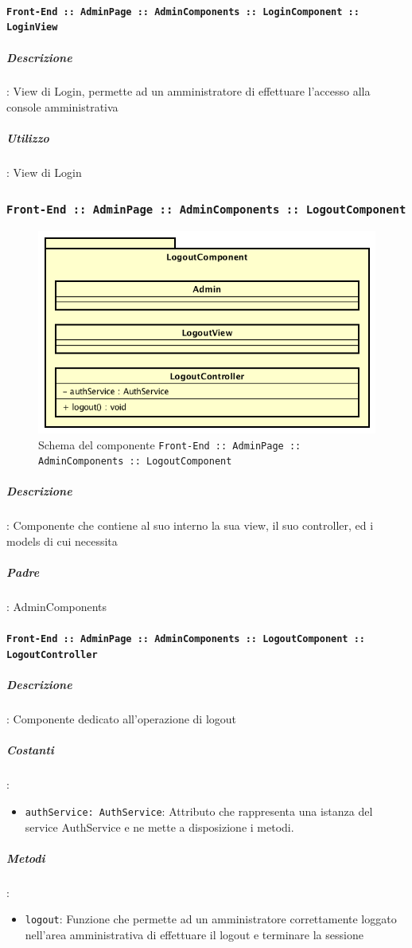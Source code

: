 \documentclass[../DefinizioneDiProdotto_v2.0.0.tex]{subfiles}
\begin{document}
	  		\paragraph{\texttt{Front-End :: AdminPage :: AdminComponents :: LoginComponent :: LoginView}}
				\subparagraph{Descrizione}: View di Login, permette ad un amministratore di effettuare l'accesso alla console amministrativa
				\subparagraph{Utilizzo}: View di Login
\newpage
	\subsubsection{\texttt{Front-End :: AdminPage :: AdminComponents :: LogoutComponent}}
	\begin{figure}[!h]
		\centering
		\includegraphics[scale=0.6]{Architettura/Front-End/AdminPage/AdminComponents/LogoutComponent.png}
		\caption{Schema del componente \texttt{Front-End :: AdminPage :: AdminComponents :: LogoutComponent}}
	\end{figure}

			\subparagraph{Descrizione}: Componente che contiene al suo interno la sua view, il suo controller, ed i models di cui necessita
			\subparagraph{Padre}: AdminComponents
	  		\paragraph{\texttt{Front-End :: AdminPage :: AdminComponents :: LogoutComponent :: LogoutController}}
				\subparagraph{Descrizione}: Componente dedicato all'operazione di logout
				\subparagraph{Costanti}:
				\begin{itemize}
					\item \texttt{authService: AuthService}: Attributo che rappresenta una istanza del service AuthService e ne mette a disposizione i metodi.
				\end{itemize}
				\subparagraph{Metodi}:
				\begin{itemize}
					\item \texttt{logout}: Funzione che permette ad un amministratore correttamente loggato nell'area amministrativa di effettuare il logout e terminare la sessione
				\end{itemize}\vspace{0.5em}
\end{document}
